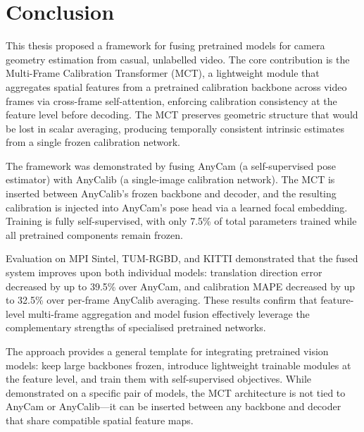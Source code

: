 
\chapter{Conclusion}\label{chapter:conclusion}

This thesis proposed a framework for fusing pretrained models for camera geometry estimation from casual, unlabelled video. The core contribution is the Multi-Frame Calibration Transformer (MCT), a lightweight module that aggregates spatial features from a pretrained calibration backbone across video frames via cross-frame self-attention, enforcing calibration consistency at the feature level before decoding. The MCT preserves geometric structure that would be lost in scalar averaging, producing temporally consistent intrinsic estimates from a single frozen calibration network.

The framework was demonstrated by fusing AnyCam (a self-supervised pose estimator) with AnyCalib (a single-image calibration network). The MCT is inserted between AnyCalib's frozen backbone and decoder, and the resulting calibration is injected into AnyCam's pose head via a learned focal embedding. Training is fully self-supervised, with only 7.5\% of total parameters trained while all pretrained components remain frozen.

Evaluation on MPI Sintel, TUM-RGBD, and KITTI demonstrated that the fused system improves upon both individual models: translation direction error decreased by up to 39.5\% over AnyCam, and calibration MAPE decreased by up to 32.5\% over per-frame AnyCalib averaging. These results confirm that feature-level multi-frame aggregation and model fusion effectively leverage the complementary strengths of specialised pretrained networks.

The approach provides a general template for integrating pretrained vision models: keep large backbones frozen, introduce lightweight trainable modules at the feature level, and train them with self-supervised objectives. While demonstrated on a specific pair of models, the MCT architecture is not tied to AnyCam or AnyCalib---it can be inserted between any backbone and decoder that share compatible spatial feature maps.
